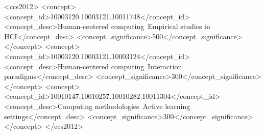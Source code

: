\documentclass[acmsmall,screen,nonacm]{acmart}
\begin{document}
\begin{abstract}
Human-in-the-loop optimization refers to systems that present choices to a human decision-maker and query their judgment to optimize system parameters iteratively. The user interface typically provides either an absolute rating scale or asks for a preferred option. However, these approaches can potentially suffer from calibration problems, inconsistencies, and completeness violations of user preferences in such a sequential evaluation. This paper revisits the design space of opinion measurement interfaces for human-in-the-loop optimization. We conducted a study (N=360) using text summarization and image color enhancement tasks to evaluate human sequential feedback in six representative opinion measurement interfaces. Based on our analysis, we recommend using a listwise approach to support sequential opinion measurement, which counterweighs individual rating and preferential choice limitations and conveys more information for subsequent use. We further discuss the trade-offs in different user interface designs and provide guidelines to inform future research.
\end{abstract}

\begin{CCSXML}
<ccs2012>
<concept>
<concept_id>10003120.10003121.10011748</concept_id>
<concept_desc>Human-centered computing~Empirical studies in HCI</concept_desc>
<concept_significance>500</concept_significance>
</concept>
<concept>
<concept_id>10003120.10003121.10003124</concept_id>
<concept_desc>Human-centered computing~Interaction paradigms</concept_desc>
<concept_significance>300</concept_significance>
</concept>
<concept>
<concept_id>10010147.10010257.10010282.10011304</concept_id>
<concept_desc>Computing methodologies~Active learning settings</concept_desc>
<concept_significance>300</concept_significance>
</concept>
</ccs2012>
\end{CCSXML}


\maketitle
\end{document}
